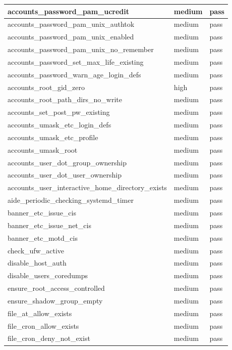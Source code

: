 \begin{longtable}{|p{10cm}|p{2cm}|p{2cm}|}
\hline
accounts\_password\_pam\_ucredit & medium & pass \\
\hline
accounts\_password\_pam\_unix\_authtok & medium & pass \\
\hline
accounts\_password\_pam\_unix\_enabled & medium & pass \\
\hline
accounts\_password\_pam\_unix\_no\_remember & medium & pass \\
\hline
accounts\_password\_set\_max\_life\_existing & medium & pass \\
\hline
accounts\_password\_warn\_age\_login\_defs & medium & pass \\
\hline
accounts\_root\_gid\_zero & high & pass \\
\hline
accounts\_root\_path\_dirs\_no\_write & medium & pass \\
\hline
accounts\_set\_post\_pw\_existing & medium & pass \\
\hline
accounts\_umask\_etc\_login\_defs & medium & pass \\
\hline
accounts\_umask\_etc\_profile & medium & pass \\
\hline
accounts\_umask\_root & medium & pass \\
\hline
accounts\_user\_dot\_group\_ownership & medium & pass \\
\hline
accounts\_user\_dot\_user\_ownership & medium & pass \\
\hline
accounts\_user\_interactive\_home\_directory\_exists & medium & pass \\
\hline
aide\_periodic\_checking\_systemd\_timer & medium & pass \\
\hline
banner\_etc\_issue\_cis & medium & pass \\
\hline
banner\_etc\_issue\_net\_cis & medium & pass \\
\hline
banner\_etc\_motd\_cis & medium & pass \\
\hline
check\_ufw\_active & medium & pass \\
\hline
disable\_host\_auth & medium & pass \\
\hline
disable\_users\_coredumps & medium & pass \\
\hline
ensure\_root\_access\_controlled & medium & pass \\
\hline
ensure\_shadow\_group\_empty & medium & pass \\
\hline
file\_at\_allow\_exists & medium & pass \\
\hline
file\_cron\_allow\_exists & medium & pass \\
\hline
file\_cron\_deny\_not\_exist & medium & pass \\

\end{longtable}
